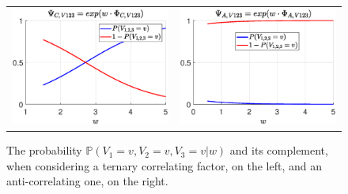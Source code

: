 \begin{figure}
\begin{tabular}{cc}
\begin{minipage}[t]{0.48 \columnwidth}
\includegraphics[width=\columnwidth]{../src/Chapter_additional/03_Samples/image_01/Ternary_corr.eps}
\end{minipage} 
 & 
\begin{minipage}[t]{0.48 \columnwidth}
\includegraphics[width=\columnwidth]{../src/Chapter_additional/03_Samples/image_01/Ternary_anitcorr.eps}
\end{minipage} 
\end{tabular}
\caption{The probability $\mathbb{P}( V_1 = v,  V_2 = v, V_3 = v | w)$ and its complement, when considering a ternary correlating factor, on the left, and an anti-correlating one, on the right.}
\label{fig:sample_01:0}
\end{figure}

